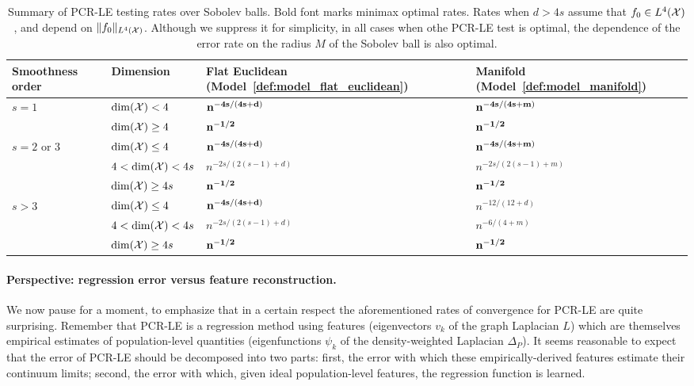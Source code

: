 \begin{table}
	\begin{center}
		\begin{tabular}{p{} p{} | p{} p{} }
			Smoothness order & Dimension & Flat Euclidean (Model~\ref{def:model_flat_euclidean}) & Manifold (Model~\ref{def:model_manifold}) \\
			\hline
			\multirow{2}{*}{$s = 1$} & $\dim(\mathcal{X}) < 4$ & ${\bf n^{-4s/(4s + d)}}$ & ${\bf n^{-4s/(4s + m)}}$ \\
			& $\dim(\mathcal{X}) \geq 4$ & ${\bf n^{-1/2}}$ & ${\bf n^{-1/2}}$ \\
			\hline
			\multirow{3}{*}{$s = 2$ or $3$} & $\dim(\mathcal{X}) \leq 4$  & ${\bf n^{-4s/(4s + d)}}$ & ${\bf n^{-4s/(4s + m)}}$ \\
			& $4 <\dim(\mathcal{X}) < 4s$  & $n^{-2s/(2(s - 1) + d)}$ & $n^{-2s/(2(s - 1) + m)}$\\
			& $\dim(\mathcal{X}) \geq 4s$ & ${\bf n^{-1/2}}$ & ${\bf n^{-1/2}}$ \\
			\hline
			\multirow{3}{*}{$s > 3$} & $\dim(\mathcal{X}) \leq 4$ & ${\bf n^{-4s/(4s + d)}}$ & $n^{-12/(12 + d)}$ \\
			& $4 < \dim(\mathcal{X}) < 4s$ & $n^{-2s/(2(s - 1) + d)}$ & $n^{-6/(4 + m)}$ \\
			& $\dim(\mathcal{X}) \geq 4s$ & ${\bf n^{-1/2}}$ & ${\bf n^{-1/2}}$ \\
		\end{tabular}
	\end{center}
	\caption{Summary of PCR-LE testing rates over Sobolev balls. Bold font marks minimax optimal rates. Rates when $d > 4s$ assume that $f_0 \in L^4(\mathcal{X})$, and depend on $\|f_0\|_{L^4(\mathcal{X})}$. Although we suppress it for simplicity, in all cases when othe PCR-LE test is optimal, the dependence of the error rate on the radius $M$ of the Sobolev ball is also optimal.}
	\label{tbl:testing_rates}
\end{table}

\paragraph{Perspective: regression error versus feature reconstruction.}
We now pause for a moment, to emphasize that in a certain respect the aforementioned rates of convergence for PCR-LE are quite surprising. Remember that PCR-LE is a regression method using features (eigenvectors $v_k$ of the graph Laplacian $L$) which are themselves empirical estimates of population-level quantities (eigenfunctions $\psi_k$ of the density-weighted Laplacian $\Delta_P$). It seems reasonable to expect that the error of PCR-LE should be decomposed into two parts: first, the error with which these empirically-derived features estimate their continuum limits; second, the error with which, given ideal population-level features, the regression function is learned.

